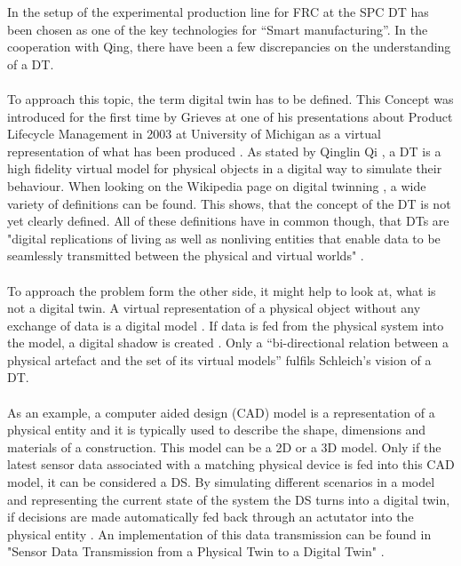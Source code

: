 In the setup of the experimental production line for \ac{FRC} at the \ac{SPC} 
\ac{DT} has been chosen as one of the key technologies for “Smart manufacturing”. In the cooperation with Qing, there have been a few discrepancies on the understanding of a \ac{DT}.\\
\\
To approach this topic, the term digital twin has to be defined.
This Concept was introduced for the first time by Grieves at one of his presentations about Product Lifecycle Management in 2003 at University of Michigan as a virtual representation of what has been produced \cite{GreivesDTfirst}.
As stated by Qinglin Qi \cite{Qi2018DigitalTS}, a \ac{DT} is a high fidelity virtual model for physical objects in a digital way to simulate their behaviour. 
When looking on the Wikipedia page on digital twinning \cite{DTwikip}, a wide variety of definitions can be found. 
This shows, that the concept of the \ac{DT} is not yet clearly defined. All of these definitions have in common though, that \acp{DT} are "digital replications of living as well as nonliving entities that 
enable data to be seamlessly transmitted between the physical and virtual worlds" \cite{SaddikDTmultimconv}.\\
\\
To approach the problem form the other side, it might help to look at, what is not a digital twin.
A virtual representation of a physical object without any exchange of data is a digital model \cite{WongWhatisDT}. 
If data is fed from the physical system into the model, a digital shadow is created \cite{KRITZINGER20181016}.
Only a “bi-directional relation between a physical artefact and the set of its virtual models” \cite{SchleichDTshaping} fulfils Schleich's vision of a \ac{DT}.\\
\\
As an example, a computer aided design (CAD) model is a representation of a physical entity and it is typically used to describe the shape, dimensions and materials of a construction. This model can be a 2D or a 3D model. Only if the latest sensor data associated with a matching physical device is fed into this CAD model, it can be considered a DS. \cite{WongWhatisDT} By simulating different scenarios in a model and representing the current state of the system the DS turns into a digital twin, if decisions are made automatically fed back through an actutator into the physical entity \cite{SchleichDTshaping}.
An implementation of this data transmission can be found in "Sensor Data Transmission from a Physical Twin to a Digital Twin" \cite{AlaDTdataTransmission}.\\
